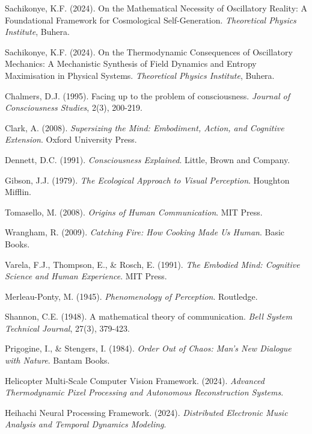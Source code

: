 \documentclass[12pt,a4paper]{article}
\begin{document}
\begin{thebibliography}{99}

Sachikonye, K.F. (2024). On the Mathematical Necessity of Oscillatory Reality: A Foundational Framework for Cosmological Self-Generation. \textit{Theoretical Physics Institute}, Buhera.

Sachikonye, K.F. (2024). On the Thermodynamic Consequences of Oscillatory Mechanics: A Mechanistic Synthesis of Field Dynamics and Entropy Maximisation in Physical Systems. \textit{Theoretical Physics Institute}, Buhera.

Chalmers, D.J. (1995). Facing up to the problem of consciousness. \textit{Journal of Consciousness Studies}, 2(3), 200-219.

Clark, A. (2008). \textit{Supersizing the Mind: Embodiment, Action, and Cognitive Extension}. Oxford University Press.

Dennett, D.C. (1991). \textit{Consciousness Explained}. Little, Brown and Company.

Gibson, J.J. (1979). \textit{The Ecological Approach to Visual Perception}. Houghton Mifflin.

Tomasello, M. (2008). \textit{Origins of Human Communication}. MIT Press.

Wrangham, R. (2009). \textit{Catching Fire: How Cooking Made Us Human}. Basic Books.

Varela, F.J., Thompson, E., \& Rosch, E. (1991). \textit{The Embodied Mind: Cognitive Science and Human Experience}. MIT Press.

Merleau-Ponty, M. (1945). \textit{Phenomenology of Perception}. Routledge.

Shannon, C.E. (1948). A mathematical theory of communication. \textit{Bell System Technical Journal}, 27(3), 379-423.

Prigogine, I., \& Stengers, I. (1984). \textit{Order Out of Chaos: Man's New Dialogue with Nature}. Bantam Books.

Helicopter Multi-Scale Computer Vision Framework. (2024). \textit{Advanced Thermodynamic Pixel Processing and Autonomous Reconstruction Systems}.

Heihachi Neural Processing Framework. (2024). \textit{Distributed Electronic Music Analysis and Temporal Dynamics Modeling}.

\end{thebibliography}
\end{document}
